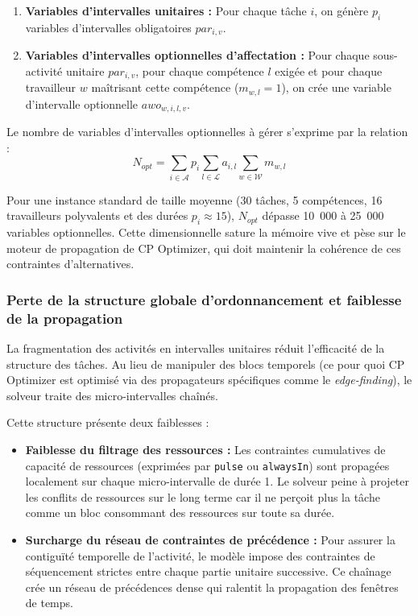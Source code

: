 \begin{enumerate}
    \item \textbf{Variables d'intervalles unitaires :} Pour chaque tâche $i$, on génère $p_i$ variables d'intervalles obligatoires $par_{i,v}$.
    \item \textbf{Variables d'intervalles optionnelles d'affectation :} Pour chaque sous-activité unitaire $par_{i,v}$, pour chaque compétence $l$ exigée et pour chaque travailleur $w$ maîtrisant cette compétence ($m_{w,l} = 1$), on crée une variable d'intervalle optionnelle $awo_{w,i,l,v}$.
\end{enumerate}

Le nombre de variables d'intervalles optionnelles à gérer s'exprime par la relation :
\begin{equation}
    N_{opt} = \sum_{i \in \mathcal{A}} p_i \sum_{l \in \mathcal{L}} a_{i,l} \sum_{w \in \mathcal{W}} m_{w,l}
\end{equation}

Pour une instance standard de taille moyenne (30 tâches, 5 compétences, 16 travailleurs polyvalents et des durées $p_i \approx 15$), $N_{opt}$ dépasse 10~000 à 25~000 variables optionnelles. Cette dimensionnelle sature la mémoire vive et pèse sur le moteur de propagation de CP Optimizer, qui doit maintenir la cohérence de ces contraintes d'alternatives.

\subsubsection{Perte de la structure globale d'ordonnancement et faiblesse de la propagation}

La fragmentation des activités en intervalles unitaires réduit l'efficacité de la structure des tâches. Au lieu de manipuler des blocs temporels (ce pour quoi CP Optimizer est optimisé via des propagateurs spécifiques comme le \textit{edge-finding}), le solveur traite des micro-intervalles chaînés.

Cette structure présente deux faiblesses :
\begin{itemize}
    \item \textbf{Faiblesse du filtrage des ressources :} Les contraintes cumulatives de capacité de ressources (exprimées par \texttt{pulse} ou \texttt{alwaysIn}) sont propagées localement sur chaque micro-intervalle de durée 1. Le solveur peine à projeter les conflits de ressources sur le long terme car il ne perçoit plus la tâche comme un bloc consommant des ressources sur toute sa durée.
    \item \textbf{Surcharge du réseau de contraintes de précédence :} Pour assurer la contiguïté temporelle de l'activité, le modèle impose des contraintes de séquencement strictes entre chaque partie unitaire successive. Ce chaînage crée un réseau de précédences dense qui ralentit la propagation des fenêtres de temps.
\end{itemize}

